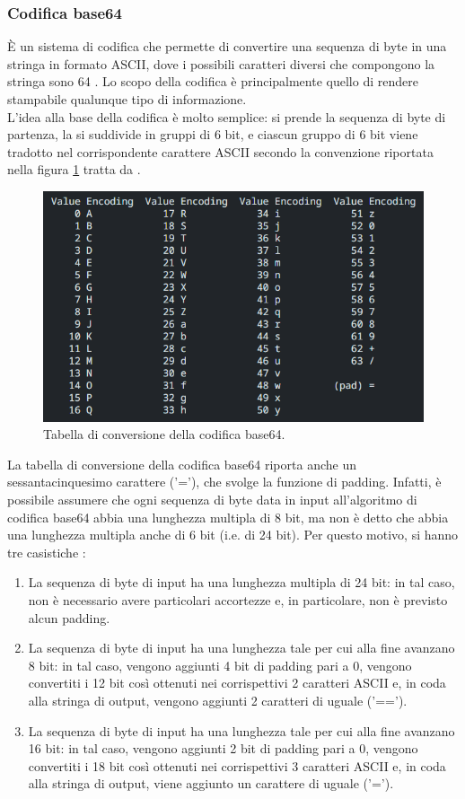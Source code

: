 \documentclass[10pt, oneside]{book}
\begin{document}
\subsubsection{Codifica base64}
È un sistema di codifica che permette di convertire una sequenza di byte in una stringa in formato ASCII, dove i possibili caratteri diversi che compongono la stringa sono 64 \cite{RFC-4648}. Lo scopo della codifica è principalmente quello di rendere stampabile qualunque tipo di informazione.\\
L'idea alla base della codifica è molto semplice: si prende la sequenza di byte di partenza, la si suddivide in gruppi di 6 bit, e ciascun gruppo di 6 bit viene tradotto nel corrispondente carattere ASCII secondo la convenzione riportata nella figura \ref{fig:base64} tratta da \cite{RFC-4648}.\\
\begin{figure}
\includegraphics[width=\linewidth]{base64.png}
\caption{Tabella di conversione della codifica base64.}
\label{fig:base64}
\end{figure}
La tabella di conversione della codifica base64 riporta anche un sessantacinquesimo carattere ('='), che svolge la funzione di padding. Infatti, è possibile assumere che ogni sequenza di byte data in input all'algoritmo di codifica base64 abbia una lunghezza multipla di 8 bit, ma non è detto che abbia una lunghezza multipla anche di 6 bit (i.e. di 24 bit). Per questo motivo, si hanno tre casistiche \cite{RFC-4648}:
\begin{enumerate}
\item La sequenza di byte di input ha una lunghezza multipla di 24 bit: in tal caso, non è necessario avere particolari accortezze e, in particolare, non è previsto alcun padding.
\item La sequenza di byte di input ha una lunghezza tale per cui alla fine avanzano 8 bit: in tal caso, vengono aggiunti 4 bit di padding pari a 0, vengono convertiti i 12 bit così ottenuti nei corrispettivi 2 caratteri ASCII e, in coda alla stringa di output, vengono aggiunti 2 caratteri di uguale ('==').
\item La sequenza di byte di input ha una lunghezza tale per cui alla fine avanzano 16 bit: in tal caso, vengono aggiunti 2 bit di padding pari a 0, vengono convertiti i 18 bit così ottenuti nei corrispettivi 3 caratteri ASCII e, in coda alla stringa di output, viene aggiunto un carattere di uguale ('=').
\end{enumerate}
\end{document}
